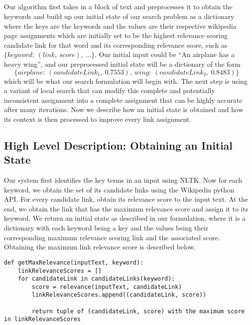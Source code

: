 \documentclass[twoside,11pt]{article}
\begin{document}
\\ \\
\\ \\
Our algorithm first takes in a block of text and preprocesses it to obtain the keywords and build up our initial state of our search problem as a dictionary where the keys are the keywords and the values are their respective wikipedia page assignments which are initially set to be the highest relevance scoring candidate link for that word and its corresponding relevance score, such as $\{keyword: \ (link, \ score), \ ...\}$. Our initial input could be ``An airplane has a heavy wing'', and our preprocessed initial state will be a dictionary of the form $$\{airplane: \ (candidateLink_1, \ 0.7553), \ wing: \ (candidateLink_2,  \ 0.8483)\}$$
which will be what our search formulation will begin with. The next step is using a variant of local search that can modify this complete and potentially inconsistent assignment into a complete assignment that can be highly accurate after many iterations. Now we describe how an initial state is obtained and how its context is then processed to improve every link assignment.



\subsection{High Level Description: Obtaining an Initial State}
Our system first identifies the key terms in an input using NLTK. Now for each keyword, we obtain the set of its candidate links using the Wikipedia python API. For every candidate link, obtain its relevance score to the input text. At the end, we obtain the link that has the maximum relevance score and assign it to its keyword. We return an initial state as described in our formulation, where it is a dictionary with each keyword being a key and the values being their corresponding maximum relevance scoring link and the associated score. Obtaining the maximum link relevance score is described below.

\begin{lstlisting}
def getMaxRelevance(inputText, keyword):
    linkRelevanceScores = []
    for candidateLink in candidateLinks(keyword):
        score = relevance(inputText, candidateLink)
        linkRelevanceScores.append((candidateLink, score))

        return tuple of (candidateLink, score) with the maximum score in linkRelevanceScores

\end{lstlisting}
\end{document}
